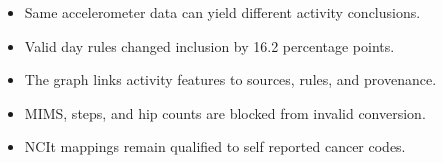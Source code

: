 \begin{itemize}
\item Same accelerometer data can yield different activity conclusions.
\item Valid day rules changed inclusion by 16.2 percentage points.
\item The graph links activity features to sources, rules, and provenance.
\item MIMS, steps, and hip counts are blocked from invalid conversion.
\item NCIt mappings remain qualified to self reported cancer codes.
\end{itemize}

